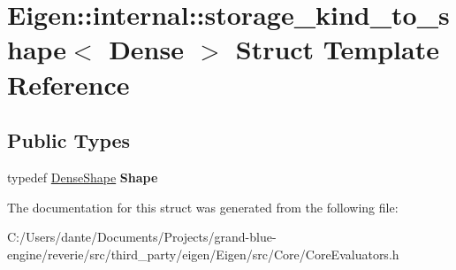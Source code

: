 \hypertarget{struct_eigen_1_1internal_1_1storage__kind__to__shape_3_01_dense_01_4}{}\section{Eigen\+::internal\+::storage\+\_\+kind\+\_\+to\+\_\+shape$<$ Dense $>$ Struct Template Reference}
\label{struct_eigen_1_1internal_1_1storage__kind__to__shape_3_01_dense_01_4}
\subsection*{Public Types}
\begin{DoxyCompactItemize}
\item 
\mbox{\label{struct_eigen_1_1internal_1_1storage__kind__to__shape_3_01_dense_01_4_ac00df7ae7c2e3a8665a9df27a306b423}} 
typedef \mbox{\hyperlink{struct_eigen_1_1_dense_shape}{Dense\+Shape}} {\bfseries Shape}
\end{DoxyCompactItemize}


The documentation for this struct was generated from the following file\+:\begin{DoxyCompactItemize}
\item 
C\+:/\+Users/dante/\+Documents/\+Projects/grand-\/blue-\/engine/reverie/src/third\+\_\+party/eigen/\+Eigen/src/\+Core/Core\+Evaluators.\+h\end{DoxyCompactItemize}

